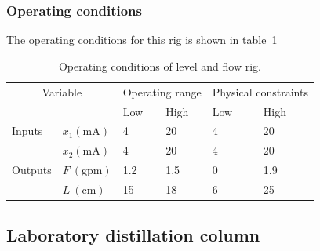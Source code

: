 \subsubsection{Operating conditions}
The operating conditions for this rig is shown in table~\ref{tab:flowopcon}
\begin{table}[htbp]
  \centering
  \begin{tabular}{llllll}
    \toprule
    \multicolumn{2}{c}{Variable} & \multicolumn{2}{c}{Operating range} & \multicolumn{2}{c}{Physical constraints} \\
    && Low & High & Low & High \\ 
    \midrule
    Inputs &$x_1 (\text{mA})$ & 4 & 20 & 4 & 20 \\
           &$x_2 (\text{mA})$ & 4 & 20 & 4 & 20 \\[1.3ex]
    Outputs &$F~(\text{gpm})$ & 1.2 & 1.5 & 0 & 1.9 \\
            &$L~(\text{cm})$  & 15 & 18 & 6 & 25 \\
    \bottomrule
  \end{tabular}
  \caption{Operating conditions of level and flow rig.}
  \label{tab:flowopcon}
\end{table}

\subsection{Laboratory distillation column}
